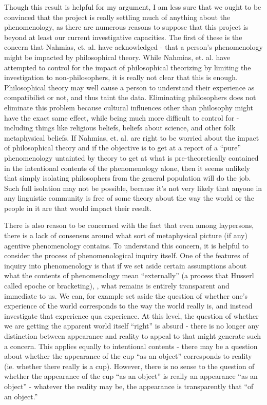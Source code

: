 \documentclass[phd,12pt,oneside,paper=letterpaper]{ubcthesis}
\begin{document}
Though this result is helpful for my argument, I am less sure that we ought to be convinced that the project is really settling much of anything about the phenomenology, as there are numerous reasons to suppose that this project is beyond at least our current investigative capacities. The first of these is the concern that Nahmias, et. al. have acknowledged - that a person's phenomenology might be impacted by philosophical theory. While Nahmias, et. al. have attempted to control for the impact of philosophical theorizing by limiting the investigation to non-philosophers, it is really not clear that this is enough. Philosophical theory may well cause a person to understand their experience as compatibilist or not, and thus taint the data. Eliminating philosophers does not eliminate this problem because cultural influences other than philosophy might have the exact same effect, while being much more difficult to control for - including things like religious beliefs, beliefs about science, and other folk metaphysical beliefs. If Nahmias, et. al. are right to be worried about the impact of philosophical theory and if the objective is to get at a report of a ``pure'' phenomenology untainted by theory to get at what is pre-theoretically contained in the intentional contents of the phenomenology alone, then it seems unlikely that simply isolating philosophers from the general population will do the job. Such full isolation may not be possible, because it's not very likely that anyone in any linguistic community is free of some theory about the way the world or the people in it are that would impact their result.

There is also reason to be concerned with the fact that even among laypersons, there is a lack of consensus around what sort of metaphysical picture (if any) agentive phenomenology contains. To understand this concern, it is helpful to consider the process of phenomenological inquiry itself. One of the features of inquiry into phenomenology is that if we set aside certain assumptions about what the contents of phenomenology mean ``externally'' (a process that Husserl called epoche or bracketing), \citep{Husserl1999}, what remains is entirely transparent and immediate to us. We can, for example set aside the question of whether one's experience of the world corresponds to the way the world really is, and instead investigate that experience qua experience. At this level, the question of whether we are getting the apparent world itself ``right'' is absurd - there is no longer any distinction between appearance and reality to appeal to that might generate such a concern. This applies equally to intentional contents - there may be a question about whether the appearance of the cup ``as an object'' corresponds to reality (ie. whether there really is a cup). However, there is no sense to the question of whether the appearance of the cup ``as an object'' is really an appearance ``as an object'' - whatever the reality may be, the appearance is transparently that ``of an object.''
\end{document}
